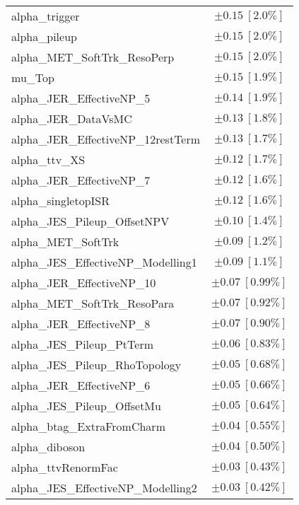\begin{table}
\begin{center}
\begin{tabular*}{\textwidth}{@{\extracolsep{\fill}}lc}
alpha\_trigger         & $\pm 0.15\ [2.0\%] $       \\
alpha\_pileup         & $\pm 0.15\ [2.0\%] $       \\
alpha\_MET\_SoftTrk\_ResoPerp         & $\pm 0.15\ [2.0\%] $       \\
mu\_Top         & $\pm 0.15\ [1.9\%] $       \\
alpha\_JER\_EffectiveNP\_5         & $\pm 0.14\ [1.9\%] $       \\
alpha\_JER\_DataVsMC         & $\pm 0.13\ [1.8\%] $       \\
alpha\_JER\_EffectiveNP\_12restTerm         & $\pm 0.13\ [1.7\%] $       \\
alpha\_ttv\_XS         & $\pm 0.12\ [1.7\%] $       \\
alpha\_JER\_EffectiveNP\_7         & $\pm 0.12\ [1.6\%] $       \\
alpha\_singletopISR         & $\pm 0.12\ [1.6\%] $       \\
alpha\_JES\_Pileup\_OffsetNPV         & $\pm 0.10\ [1.4\%] $       \\
alpha\_MET\_SoftTrk         & $\pm 0.09\ [1.2\%] $       \\
alpha\_JES\_EffectiveNP\_Modelling1         & $\pm 0.09\ [1.1\%] $       \\
alpha\_JER\_EffectiveNP\_10         & $\pm 0.07\ [0.99\%] $       \\
alpha\_MET\_SoftTrk\_ResoPara         & $\pm 0.07\ [0.92\%] $       \\
alpha\_JER\_EffectiveNP\_8         & $\pm 0.07\ [0.90\%] $       \\
alpha\_JES\_Pileup\_PtTerm         & $\pm 0.06\ [0.83\%] $       \\
alpha\_JES\_Pileup\_RhoTopology         & $\pm 0.05\ [0.68\%] $       \\
alpha\_JER\_EffectiveNP\_6         & $\pm 0.05\ [0.66\%] $       \\
alpha\_JES\_Pileup\_OffsetMu         & $\pm 0.05\ [0.64\%] $       \\
alpha\_btag\_ExtraFromCharm         & $\pm 0.04\ [0.55\%] $       \\
alpha\_diboson         & $\pm 0.04\ [0.50\%] $       \\
alpha\_ttvRenormFac         & $\pm 0.03\ [0.43\%] $       \\
alpha\_JES\_EffectiveNP\_Modelling2         & $\pm 0.03\ [0.42\%] $       \\

\end{tabular*}
\end{center}
\end{table}
